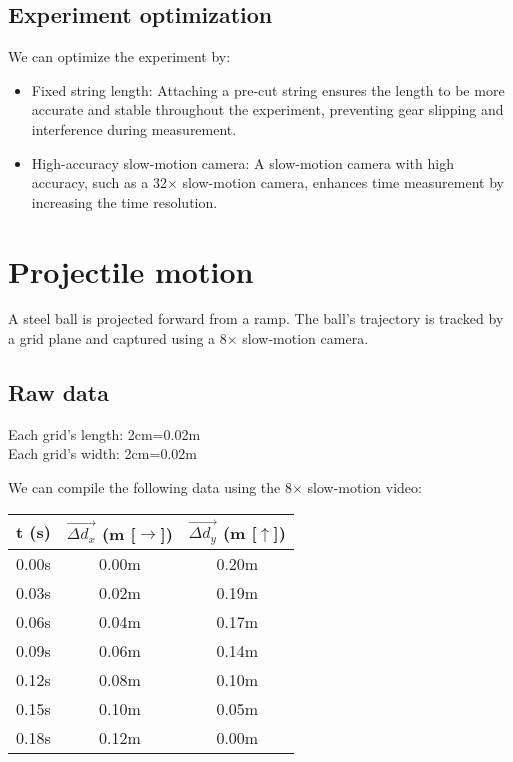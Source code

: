 \documentclass[a4paper,12pt]{article}
\begin{document}
	\subsection{Experiment optimization}
	We can optimize the experiment by:
	\begin{itemize}
		\item Fixed string length: Attaching a pre-cut string ensures the length to be more accurate and stable throughout the experiment, preventing gear slipping and interference during measurement. 
		\item High-accuracy slow-motion camera: A slow-motion camera with high accuracy, such as a 32× slow-motion camera, enhances time measurement by increasing the time resolution.
	\end{itemize}
	\newpage
	
	\section{Projectile motion}
	A steel ball is projected forward from a ramp. The ball's trajectory is tracked by a grid plane and captured using a 8$\times$ slow-motion camera.
	
	\subsection{Raw data}
	Each grid's length: 2cm=0.02m\\
	Each grid's width: 2cm=0.02m
	
	We can compile the following data using the 8$\times$ slow-motion video:
	\bigskip
	\bigskip
	\begin{center}
		\begin{tabular}{ |c|c|c| } 
			\hline
			t (s) & $\vec{\Delta d_x}$ (m [$\rightarrow$]) & $\vec{\Delta d_y}$ (m [$\uparrow$]) \\ 
			\hline\hline
			0.00s & 0.00m & 0.20m\\
			\hline 
			0.03s & 0.02m & 0.19m \\ 
			\hline
			0.06s & 0.04m & 0.17m \\
			\hline
			0.09s & 0.06m & 0.14m \\
			\hline
			0.12s & 0.08m & 0.10m \\
			\hline
			0.15s & 0.10m & 0.05m \\
			\hline
			0.18s & 0.12m & 0.00m \\
			\hline
		\end{tabular} 
	\end{center}
	\bigskip
	\bigskip
	\bigskip
	
\end{document}
